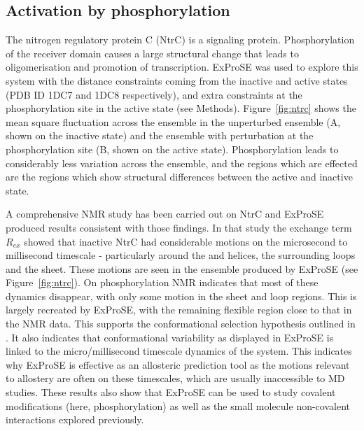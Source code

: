 \subsection{Activation by phosphorylation}

The nitrogen regulatory protein C (NtrC) is a signaling protein.
Phosphorylation of the receiver domain causes a large structural change \cite{Kern1999} that leads to oligomerisation and promotion of transcription.
ExProSE was used to explore this system with the distance constraints coming from the inactive and active states (PDB ID 1DC7 and 1DC8 respectively), and extra constraints at the phosphorylation site in the active state (see Methods).
Figure~\ref{fig:ntrc} shows the mean square fluctuation across the ensemble in the unperturbed ensemble (A, shown on the inactive state) and the ensemble with perturbation at the phosphorylation site (B, shown on the active state).
Phosphorylation leads to considerably less variation across the ensemble, and the regions which are effected are the regions which show structural differences between the active and inactive state.

A comprehensive NMR study has been carried out on NtrC \cite{Volkman2001} and ExProSE produced results consistent with those findings.
In that study the exchange term $R_{ex}$ showed that inactive NtrC had considerable motions on the microsecond to millisecond timescale - particularly around the  and  helices, the surrounding loops and the  sheet.
These motions are seen in the ensemble produced by ExProSE (see Figure~\ref{fig:ntrc}).
On phosphorylation NMR indicates that most of these dynamics disappear, with only some motion in the  sheet and loop regions.
This is largely recreated by ExProSE, with the remaining flexible region close to that in the NMR data.
This supports the conformational selection hypothesis outlined in \cite{Volkman2001}.
It also indicates that conformational variability as displayed in ExProSE is linked to the micro/millisecond timescale dynamics of the system.
This indicates why ExProSE is effective as an allosteric prediction tool as the motions relevant to allostery are often on these timescales, which are usually inaccessible to MD studies.
These results also show that ExProSE can be used to study covalent modifications (here, phosphorylation) as well as the small molecule non-covalent interactions explored previously.


